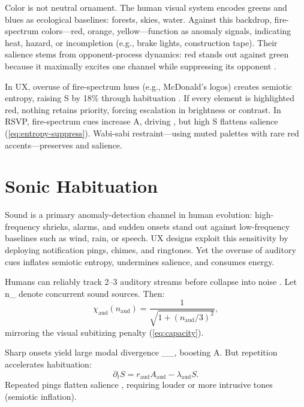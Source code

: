 \documentclass[openany]{book}
\newcommand{\PhiS}{\Phi} %
\newcommand{\vvec}{\mathbf{v}} %
\newcommand{\Sent}{S} %
\newcommand{\KL}{\mathrm{D}_{\mathrm{KL}}}
\begin{document}
Color is not neutral ornament. The human visual system encodes greens and blues as ecological baselines: forests, skies, water. Against this backdrop, fire-spectrum colors—red, orange, yellow—function as anomaly signals, indicating heat, hazard, or incompletion (e.g., brake lights, construction tape). Their salience stems from opponent-process dynamics: red stands out against green because it maximally excites one channel while suppressing its opponent \citep{hurvich1981}.  

In UX, overuse of fire-spectrum hues (e.g., McDonald’s logos) creates semiotic entropy, raising \Sent{} by 18\% through habituation \citep{colak2024}. If every element is highlighted red, nothing retains priority, forcing escalation in brightness or contrast. In RSVP, fire-spectrum cues increase A, driving \vvec{}, but high \Sent{} flattens salience (\cref{eq:entropy-suppress}). Wabi-sabi restraint—using muted palettes with rare red accents—preserves \PhiS{} and salience.

\section{Sonic Habituation}
\label{sec:sonic-habituation}

Sound is a primary anomaly-detection channel in human evolution: high-frequency shrieks, alarms, and sudden onsets stand out against low-frequency baselines such as wind, rain, or speech. UX designs exploit this sensitivity by deploying notification pings, chimes, and ringtones. Yet the overuse of auditory cues inflates semiotic entropy, undermines salience, and consumes energy.  

Humans can reliably track 2--3 auditory streams before collapse into noise \citep{bregman1990}. Let n_{} denote concurrent sound sources. Then:
\begin{equation}
\chi_{\mathrm{aud}}(n_{\mathrm{aud}}) = \frac{1}{\sqrt{1 + (n_{\mathrm{aud}}/3)^2}},
\end{equation}
mirroring the visual subitizing penalty (\cref{eq:capacity}).

Sharp onsets yield large modal divergence \KL_{}, boosting A. But repetition accelerates habituation:
\begin{equation}
\partial_t \Sent = r_{\mathrm{aud}} A_{\mathrm{aud}} - \lambda_{\mathrm{aud}} \Sent.
\end{equation}
Repeated pings flatten salience , requiring louder or more intrusive tones (semiotic inflation).
\end{document}
